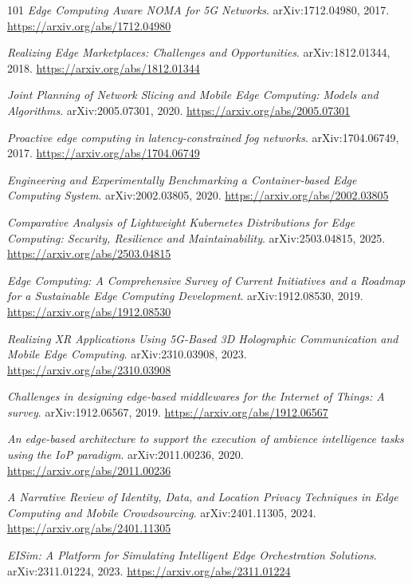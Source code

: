 \documentclass[11pt,a4paper]{article}
\begin{document}
\begin{thebibliography}{101}
\newblock \emph{Edge Computing Aware NOMA for 5G Networks}.
\newblock arXiv:1712.04980, 2017.
\newblock \url{https://arxiv.org/abs/1712.04980}

\newblock \emph{Realizing Edge Marketplaces: Challenges and Opportunities}.
\newblock arXiv:1812.01344, 2018.
\newblock \url{https://arxiv.org/abs/1812.01344}

\newblock \emph{Joint Planning of Network Slicing and Mobile Edge Computing: Models and Algorithms}.
\newblock arXiv:2005.07301, 2020.
\newblock \url{https://arxiv.org/abs/2005.07301}

\newblock \emph{Proactive edge computing in latency-constrained fog networks}.
\newblock arXiv:1704.06749, 2017.
\newblock \url{https://arxiv.org/abs/1704.06749}

\newblock \emph{Engineering and Experimentally Benchmarking a Container-based Edge Computing System}.
\newblock arXiv:2002.03805, 2020.
\newblock \url{https://arxiv.org/abs/2002.03805}

\newblock \emph{Comparative Analysis of Lightweight Kubernetes Distributions for Edge Computing: Security, Resilience and Maintainability}.
\newblock arXiv:2503.04815, 2025.
\newblock \url{https://arxiv.org/abs/2503.04815}

\newblock \emph{Edge Computing: A Comprehensive Survey of Current Initiatives and a Roadmap for a Sustainable Edge Computing Development}.
\newblock arXiv:1912.08530, 2019.
\newblock \url{https://arxiv.org/abs/1912.08530}

\newblock \emph{Realizing XR Applications Using 5G-Based 3D Holographic Communication and Mobile Edge Computing}.
\newblock arXiv:2310.03908, 2023.
\newblock \url{https://arxiv.org/abs/2310.03908}

\newblock \emph{Challenges in designing edge-based middlewares for the Internet of Things: A survey}.
\newblock arXiv:1912.06567, 2019.
\newblock \url{https://arxiv.org/abs/1912.06567}

\newblock \emph{An edge-based architecture to support the execution of ambience intelligence tasks using the IoP paradigm}.
\newblock arXiv:2011.00236, 2020.
\newblock \url{https://arxiv.org/abs/2011.00236}

\newblock \emph{A Narrative Review of Identity, Data, and Location Privacy Techniques in Edge Computing and Mobile Crowdsourcing}.
\newblock arXiv:2401.11305, 2024.
\newblock \url{https://arxiv.org/abs/2401.11305}

\newblock \emph{EISim: A Platform for Simulating Intelligent Edge Orchestration Solutions}.
\newblock arXiv:2311.01224, 2023.
\newblock \url{https://arxiv.org/abs/2311.01224}

\end{thebibliography}
\end{document}
